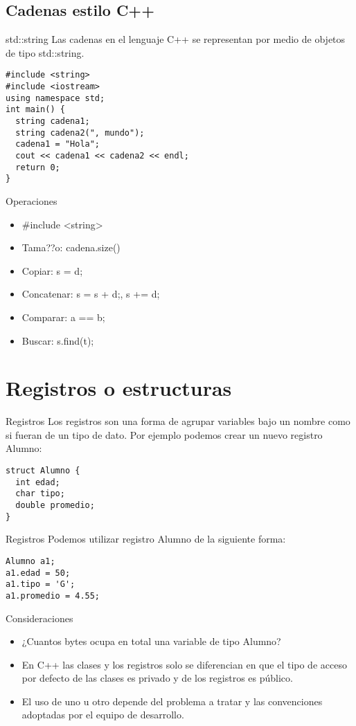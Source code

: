\documentclass[aspectratio=169]{beamer}
\begin{document}
\subsection{Cadenas estilo C++}
\begin{frame}[fragile]{std::string}
Las cadenas en el lenguaje C++ se representan por medio de objetos de tipo std::string.
\begin{lstlisting}
#include <string>
#include <iostream>
using namespace std;
int main() {
  string cadena1;
  string cadena2(", mundo");
  cadena1 = "Hola";
  cout << cadena1 << cadena2 << endl;
  return 0;
}
\end{lstlisting}
\end{frame}
\begin{frame}{Operaciones}
\begin{itemize}
\item \#include <string> 
\item Tama??o: cadena.size()
\item Copiar: s = d;
\item Concatenar: s = s + d;, s += d;
\item Comparar: a == b;
\item Buscar: s.find(t);
\end{itemize}
\end{frame}
\section{Registros o estructuras}
\begin{frame}[fragile]{Registros}
Los registros son una forma de agrupar variables bajo un nombre como si fueran de un tipo de dato.
Por ejemplo podemos crear un nuevo registro Alumno:
\begin{lstlisting}
struct Alumno {
  int edad;
  char tipo;
  double promedio;
}
\end{lstlisting}
\end{frame}
\begin{frame}[fragile]{Registros}
Podemos utilizar registro Alumno de la siguiente forma:
\begin{lstlisting}
Alumno a1;
a1.edad = 50;
a1.tipo = 'G';
a1.promedio = 4.55;
\end{lstlisting}
\end{frame}
\begin{frame}{Consideraciones}
\begin{itemize}
\item ¿Cuantos bytes ocupa en total una variable de tipo Alumno?
\item En C++ las clases y los registros solo se diferencian en que el tipo de acceso por defecto de las clases es privado y de los registros es público.
\item El uso de uno u otro depende del problema a tratar y las convenciones adoptadas por el equipo de desarrollo.
\end{itemize}
\end{frame}
\end{document}
